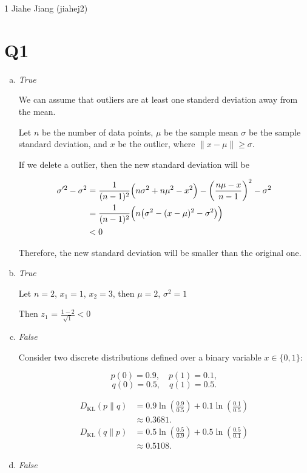 \documentclass[11pt]{article}
\begin{document}
\homework
{1} %
{Jiahe Jiang (jiahej2)}

\section*{Q1}
\begin{enumerate}[a.]
	\item
		\textit{True}

		We can assume that outliers are at least one
		standerd deviation away from the mean.

		Let \(n\) be the number of data points, \(\mu\) be the sample mean
		\(\sigma\) be the sample standard deviation, and \(x\) be the outlier,
		where \(\|{x - \mu} \| \geq \sigma\).

		If we delete a outlier, then the new standard deviation will be

		\begin{align}
			\sigma'^2 - \sigma^2 & = \frac{1}{(n - 1)^2} \Bigl( n \sigma ^2  + n \mu ^2 - x ^2\Bigr) - \left( \frac{n \mu - x}{n- 1} \right)^2 - \sigma ^2 \\
								 & = \frac{1}{(n - 1)^2} \Bigl(n\bigl(\sigma^2 - (x - \mu)^2 - \sigma^2\bigr)\Bigr)                                        \\
								 & < 0
		\end{align}

		Therefore, the new standard deviation will be smaller than the original one.
	\item
		\textit{True}

		Let \(n = 2\), \(x_1 = 1\), \(x_2 = 3\), then
		\(\mu = 2\), \(\sigma^2 = 1\)

		Then \(z_1\) = \(\frac{1 - 2}{\sqrt{1}} < 0\)
	\item
		\textit{False}

		Consider two discrete distributions defined over a binary variable \( x \in \{0, 1\} \):

		\[
			p(0)=0.9,\quad p(1)=0.1,
		\]
		\[
			q(0)=0.5,\quad q(1)=0.5.
		\]

		\begin{align*}
			D_{\mathrm{KL}}(p \parallel q) &= 0.9 \ln\left(\frac{0.9}{0.5}\right) + 0.1 \ln\left(\frac{0.1}{0.5}\right)\\[1ex]
										   &\approx 0.3681.
		\end{align*}
		\begin{align*}
			D_{\mathrm{KL}}(q \parallel p) &= 0.5 \ln\left(\frac{0.5}{0.9}\right) + 0.5 \ln\left(\frac{0.5}{0.1}\right)\\[1ex]
										   &\approx 0.5108.
		\end{align*}
	\item
		\textit{False}


\end{enumerate}
\end{document}
